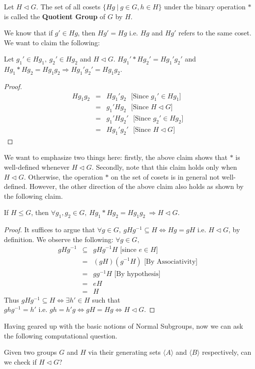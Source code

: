 \begin{definition}\label{QG}
	Let $H\triangleleft G$. The set of all cosets $\{Hg~|~g\in G, h\in H\}$ under the binary operation $*$ is called the {\bf Quotient Group} of $G$ by $H$.
\end{definition}
We know that if $g'\in Hg$, then $Hg' = Hg$ i.e. $Hg$ and $Hg'$ refers to the same coset. We want to claim the following:
\begin{claim}
	Let $g_1'\in Hg_1,~g_2'\in Hg_2$ and $H\triangleleft G$. $Hg_1'*Hg_2'=Hg_1'g_2'$ and $Hg_1*Hg_2 = Hg_1g_2 \Longrightarrow Hg_1'g_2' = Hg_1g_2$. 
\end{claim}
\begin{proof}
	\begin{eqnarray}
		Hg_1g_2 &=& Hg_1'g_2~~~\text{[Since }g_1'\in Hg_1\text{]}\\
				&=& g_1'Hg_2~~~\text{[Since }H\triangleleft G\text{]}\\
				&=& g_1'Hg_2'~~~\text{[Since }g_2'\in Hg_2\text{]}\\
				&=& Hg_1'g_2'~~~\text{[Since }H\triangleleft G\text{]}
	\end{eqnarray}
\end{proof}
We want to emphasize two things here: firstly, the above claim shows that $*$ is well-defined whenever $H\triangleleft G$. Secondly, note that this claim holds only when $H\triangleleft G$. Otherwise, the operation $*$ on the set of cosets is in general not well-defined. However, the other direction of the above claim also holds as shown by the following claim.
\begin{claim}
	If $H\leq G$, then $\forall g_1,g_2\in G,~Hg_1*Hg_2 = Hg_1g_2~\Longrightarrow H\triangleleft G$. 
\end{claim}
\begin{proof}
	It suffices to argue that $\forall g\in G,~ gHg^{-1}\subseteq H\Longleftrightarrow Hg=gH$ i.e. $H\triangleleft G$, by definition. We observe the following: $\forall g\in G,$
	\begin{eqnarray*}
		gHg^{-1}&\subseteq& gHg^{-1}H\text{ [since }e\in H]\\
				&=&(gH)(g^{-1}H)\text{ [By Associativity]}\\
				&=&gg^{-1}H\text{ [By hypothesis]}\\
				&=&eH\\
				&=&H
	\end{eqnarray*}
	Thus $gHg^{-1}\subseteq H \Longleftrightarrow \exists h' \in H$ such that $ghg^{-1} = h'\text{ i.e. }gh = h'g \Longleftrightarrow gH = Hg \Longleftrightarrow H\triangleleft G$.
\end{proof}
Having geared up with the basic notions of Normal Subgroups, now we can ask the following computational question.
\begin{problem}\label{2}
	Given two groups $G$ and $H$ via their generating sets $\langle A\rangle$ and $\langle B\rangle$ respectively, can we check if $H\triangleleft G$?
\end{problem}
